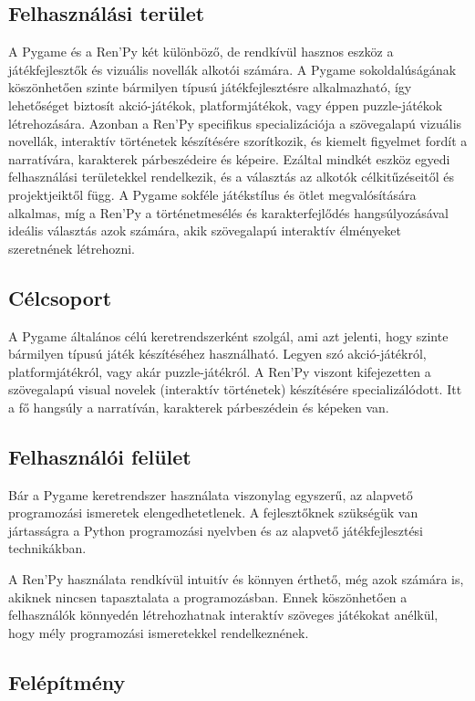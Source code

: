 \subsection{Felhasználási terület}
 A Pygame és a Ren'Py két különböző, de rendkívül hasznos eszköz a játékfejlesztők és vizuális novellák alkotói számára. A Pygame sokoldalúságának köszönhetően szinte bármilyen típusú játékfejlesztésre alkalmazható, így lehetőséget biztosít akció-játékok, platformjátékok, vagy éppen puzzle-játékok létrehozására. Azonban a Ren'Py specifikus specializációja a szövegalapú vizuális novellák, interaktív történetek készítésére szorítkozik, és kiemelt figyelmet fordít a narratívára, karakterek párbeszédeire és képeire. Ezáltal mindkét eszköz egyedi felhasználási területekkel rendelkezik, és a választás az alkotók célkitűzéseitől és projektjeiktől függ. A Pygame sokféle játékstílus és ötlet megvalósítására alkalmas, míg a Ren'Py a történetmesélés és karakterfejlődés hangsúlyozásával ideális választás azok számára, akik szövegalapú interaktív élményeket szeretnének létrehozni.

\subsection{Célcsoport}

 A Pygame általános célú keretrendszerként szolgál, ami azt jelenti, hogy szinte bármilyen típusú játék készítéséhez használható. Legyen szó akció-játékról, platformjátékról, vagy akár puzzle-játékról.
A Ren'Py viszont kifejezetten a szövegalapú visual novelek (interaktív történetek) készítésére specializálódott. Itt a fő hangsúly a narratíván, karakterek párbeszédein és képeken van.

\subsection{Felhasználói felület}

 Bár a Pygame keretrendszer használata viszonylag egyszerű, az alapvető programozási ismeretek elengedhetetlenek. A fejlesztőknek szükségük van jártasságra a Python programozási nyelvben és az alapvető játékfejlesztési technikákban.

A Ren'Py használata rendkívül intuitív és könnyen érthető, még azok számára is, akiknek nincsen tapasztalata a programozásban. Ennek köszönhetően a felhasználók könnyedén létrehozhatnak interaktív szöveges játékokat anélkül, hogy mély programozási ismeretekkel rendelkeznének.
\subsection{Felépítmény}

